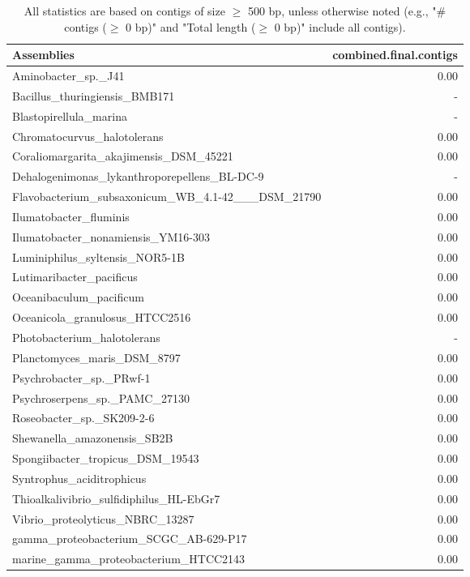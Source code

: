 \documentclass[12pt,a4paper]{article}
\begin{document}
\begin{table}[ht]
\begin{center}
\caption{All statistics are based on contigs of size $\geq$ 500 bp, unless otherwise noted (e.g., "\# contigs ($\geq$ 0 bp)" and "Total length ($\geq$ 0 bp)" include all contigs).}
\begin{tabular}{|l*{1}{|r}|}
\hline
Assemblies & combined.final.contigs \\ \hline
Aminobacter\_sp.\_J41 & 0.00 \\ \hline
Bacillus\_thuringiensis\_BMB171 & - \\ \hline
Blastopirellula\_marina & - \\ \hline
Chromatocurvus\_halotolerans & 0.00 \\ \hline
Coraliomargarita\_akajimensis\_DSM\_45221 & 0.00 \\ \hline
Dehalogenimonas\_lykanthroporepellens\_BL-DC-9 & - \\ \hline
Flavobacterium\_subsaxonicum\_WB\_4.1-42\_\_\_DSM\_21790 & 0.00 \\ \hline
Ilumatobacter\_fluminis & 0.00 \\ \hline
Ilumatobacter\_nonamiensis\_YM16-303 & 0.00 \\ \hline
Luminiphilus\_syltensis\_NOR5-1B & 0.00 \\ \hline
Lutimaribacter\_pacificus & 0.00 \\ \hline
Oceanibaculum\_pacificum & 0.00 \\ \hline
Oceanicola\_granulosus\_HTCC2516 & 0.00 \\ \hline
Photobacterium\_halotolerans & - \\ \hline
Planctomyces\_maris\_DSM\_8797 & 0.00 \\ \hline
Psychrobacter\_sp.\_PRwf-1 & 0.00 \\ \hline
Psychroserpens\_sp.\_PAMC\_27130 & 0.00 \\ \hline
Roseobacter\_sp.\_SK209-2-6 & 0.00 \\ \hline
Shewanella\_amazonensis\_SB2B & 0.00 \\ \hline
Spongiibacter\_tropicus\_DSM\_19543 & 0.00 \\ \hline
Syntrophus\_aciditrophicus & 0.00 \\ \hline
Thioalkalivibrio\_sulfidiphilus\_HL-EbGr7 & 0.00 \\ \hline
Vibrio\_proteolyticus\_NBRC\_13287 & 0.00 \\ \hline
gamma\_proteobacterium\_SCGC\_AB-629-P17 & 0.00 \\ \hline
marine\_gamma\_proteobacterium\_HTCC2143 & 0.00 \\ \hline
\end{tabular}
\end{center}
\end{table}
\end{document}
